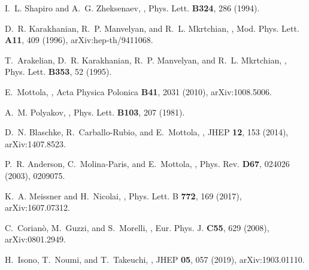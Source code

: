 \documentclass[a4paper,11pt,openright,twoside]{book}
\numberwithin{equation}{section}
\begin{document}
{{\begin{thebibliography}{100}
	I.~L. Shapiro and A.~G. Zheksenaev,
	,
	\newblock Phys. Lett. {\bf B324}, 286 (1994).
	
	D.~R. Karakhanian, R.~P. Manvelyan, and R.~L. Mkrtchian,
	,
	\newblock Mod. Phys. Lett. {\bf A11}, 409 (1996), arXiv:hep-th/9411068.
	
	T.~Arakelian, D.~R. Karakhanian, R.~P. Manvelyan, and R.~L. Mkrtchian,
	,
	\newblock Phys. Lett. {\bf B353}, 52 (1995).
	
	E.~Mottola,
	,
	\newblock Acta Physica Polonica {\bf B41}, 2031 (2010), arXiv:1008.5006.
	
	A.~M. Polyakov,
	,
	\newblock Phys. Lett. {\bf B103}, 207 (1981).
	
	D.~N. Blaschke, R.~Carballo-Rubio, and E.~Mottola,
	,
	\newblock JHEP {\bf 12}, 153 (2014), arXiv:1407.8523.
	
	P.~R. Anderson, C.~Molina-Paris, and E.~Mottola,
	,
	\newblock Phys. Rev. {\bf D67}, 024026 (2003), 0209075.
	
	K.~A. Meissner and H.~Nicolai,
	,
	\newblock Phys. Lett. B {\bf 772}, 169 (2017), arXiv:1607.07312.
	
	C.~Corian\`o, M.~Guzzi, and S.~Morelli,
	,
	\newblock Eur. Phys. J. {\bf C55}, 629 (2008), arXiv:0801.2949.
	
	H.~Isono, T.~Noumi, and T.~Takeuchi,
	,
	\newblock JHEP {\bf 05}, 057 (2019), arXiv:1903.01110.
	

\end{thebibliography}}}
\end{document}
